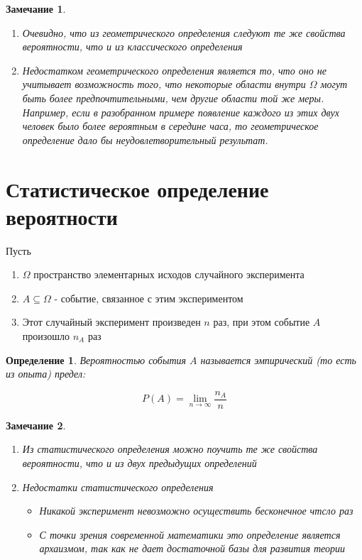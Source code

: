 \documentclass[a4paper, 14pt]{report}
\newtheorem{defenition}{Определение}[section]
\newtheorem{note}{Замечание}[section]
\begin{document}
\begin{note}
    \begin{enumerate}
        \item Очевидно, что из геометрического определения следуют те же свойства вероятности, что и из классического определения
        \item Недостатком геометрического определения является то, что оно не учитывает возможность того, что некоторые области внутри $\Omega$ могут быть более предпочтительными, чем другие области той же меры. Например, если в разобранном примере появление каждого из этих двух человек было более вероятным в середине часа, то геометрическое определение дало бы неудовлетворительный результат.
    \end{enumerate}
\end{note}

\section{Статистическое определение вероятности}

Пусть 

\begin{enumerate}
    \item $\Omega$ пространство элементарных исходов случайного эксперимента
    \item $A \subseteq \Omega$ - событие, связанное с этим экспериментом
    \item Этот случайный эксперимент произведен $n$ раз, при этом событие $A$ произошло $n_A$ раз
\end{enumerate}

\begin{defenition}
    Вероятностью события $A$ называется эмпирический (то есть из опыта) предел:

    $$
    P(A) = \lim_{n \to \infty} \frac{n_A}{n}
    $$
\end{defenition}

\begin{note}
    \begin{enumerate}
        \item Из статистического определения можно поучить те же свойства вероятности, что и из двух предыдущих определений
        \item Недостатки статистического определения

            \begin{itemize}
                \item Никакой эксперимент невозможно осуществить бесконечное чтсло раз
                \item С точки зрения современной математики это определение является архаизмом, так как не дает достаточной базы для развития теории
            \end{itemize}
    \end{enumerate}
\end{note}
\end{document}
